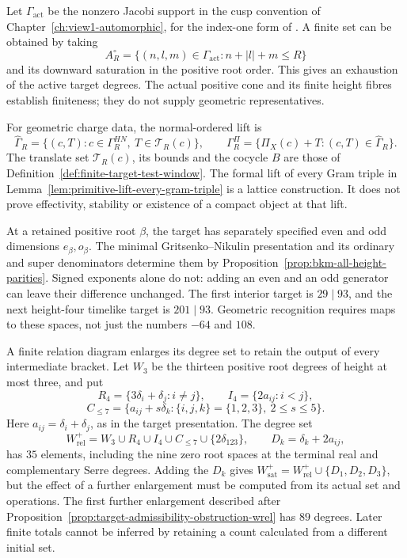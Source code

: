 Let \(\Gamma_{\mathrm{act}}\) be the nonzero Jacobi support in
the cusp convention of Chapter~\ref{ch:view1-automorphic}, for the
index-one form of \cite{EZ:1}. A finite
set can be obtained by taking
\[
 A_R^\circ=
 \{(n,l,m)\in\Gamma_{\mathrm{act}}:n+|l|+m\le R\}
\]
and its downward saturation in the positive root order. This gives
an exhaustion of the active target degrees. The actual positive
cone and its finite height fibres establish finiteness; they do not
supply geometric representatives.

For geometric charge data, the normal-ordered lift is
\[
 \widehat\Gamma_R=
 \{(c,T):c\in\Gamma_R^{HN},\ T\in\mathcal T_R(c)\},
 \qquad
 \Gamma_R^\Pi=\{\Pi_X(c)+T:(c,T)\in\widehat\Gamma_R\}.
\]
The translate set \(\mathcal T_R(c)\), its bounds and the cocycle
\(B\) are those of Definition~\ref{def:finite-target-test-window}.
The formal lift of every Gram triple in
Lemma~\ref{lem:primitive-lift-every-gram-triple} is a lattice
construction. It does not prove effectivity, stability or existence
of a compact object at that lift.

At a retained positive root \(\beta\), the target has separately
specified even and odd dimensions \(e_\beta,o_\beta\).
The minimal Gritsenko--Nikulin presentation and its ordinary and
super denominators \cite{GN,GNPartI,GNII} determine them by
Proposition~\ref{prop:bkm-all-height-parities}.
Signed exponents alone do not: adding an even and an odd generator
can leave their difference unchanged. The first interior target is
\(29\mid93\), and the next height-four timelike target is
\(201\mid93\). Geometric recognition requires maps to these
spaces, not just the numbers \(-64\) and \(108\).

A finite relation diagram enlarges its degree set to retain the
output of every intermediate bracket. Let \(W_3\) be the thirteen
positive root degrees of height at most three, and put
\[
 R_4=\{3\delta_i+\delta_j:i\ne j\},\qquad
 I_4=\{2a_{ij}:i<j\},
\]
\[
 C_{\le7}=\{a_{ij}+s\delta_k:
       \{i,j,k\}=\{1,2,3\},\ 2\le s\le5\}.
\]
Here \(a_{ij}=\delta_i+\delta_j\), as in the target presentation.
The degree set
\[
 W_{\mathrm{rel}}^+
 =W_3\cup R_4\cup I_4\cup C_{\le7}
       \cup\{2\delta_{123}\},
 \qquad
 D_k=\delta_k+2a_{ij},
\]
has \(35\) elements, including the nine zero root spaces at the
terminal real and complementary Serre degrees.
Adding the \(D_k\) gives
\(W_{\mathrm{sat}}^+=W_{\mathrm{rel}}^+\cup\{D_1,D_2,D_3\}\),
but the effect of a further enlargement must be computed from its
actual set and operations. The first further enlargement described
after Proposition~\ref{prop:target-admissibility-obstruction-wrel}
has \(89\) degrees. Later finite totals cannot be inferred
by retaining a count calculated from a different initial set.

